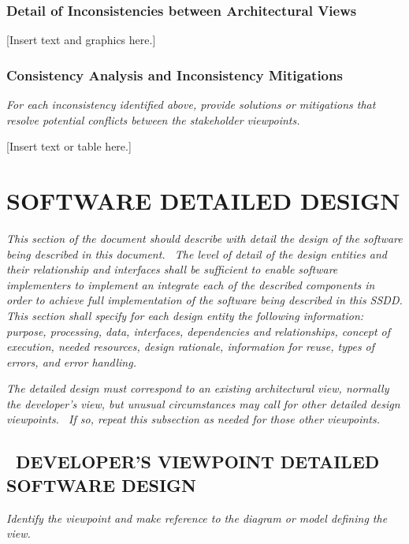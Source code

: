 \documentclass[twoside,letterpaper]{article}
\begin{document}
\subsubsection{Detail of Inconsistencies between Architectural Views}
{\color{black}
[Insert text and graphics here.]}

\subsubsection{Consistency Analysis and Inconsistency Mitigations}
{\itshape\color{black}
For each inconsistency identified above, provide solutions or
mitigations that resolve potential conflicts between the stakeholder
viewpoints.}

{\color{black}
[Insert text or table here.]}

\section{SOFTWARE DETAILED DESIGN}
{\itshape\color{black}
This section of the document should describe with detail the design of
the software being described in this document. \ The level of detail of
the design entities and their relationship and interfaces shall be
sufficient to enable software implementers to implement an integrate
each of the described components in order to achieve full
implementation of the software being described in this SSDD. This
section shall specify for each design entity the following information:
purpose, processing, data, interfaces, dependencies and relationships,
concept of execution, needed resources, design rationale, information
for reuse, types of errors, and error handling. \ }


\bigskip

{\itshape\color{black}
The detailed design must correspond to an existing architectural view,
normally the developer{\textquoteright}s view, but unusual
circumstances may call for other detailed design viewpoints. \ If so,
repeat this subsection as needed for those other viewpoints.}

\subsection[\ DEVELOPER{\textquoteright}S VIEWPOINT DETAILED SOFTWARE
DESIGN]{\foreignlanguage{english}{\ }\foreignlanguage{english}{DEVELOPER{\textquoteright}S
VIEWPOINT DETAILED SOFTWARE DESIGN}}
{\itshape\color{black}
Identify the viewpoint and make reference to the diagram or model
defining the view.}
\end{document}
